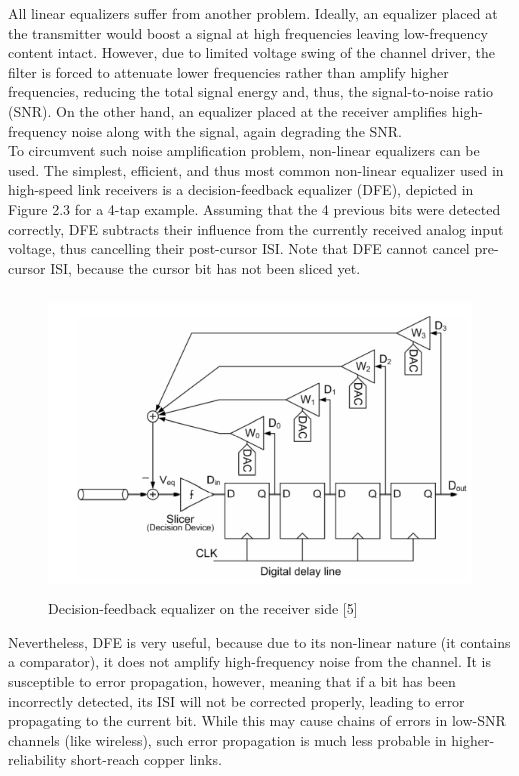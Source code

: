 All linear equalizers suffer from another problem. Ideally, an equalizer 
placed at the transmitter would boost a signal at high frequencies leaving low-frequency content intact. However, due to limited voltage swing of the channel driver, 
the filter is forced to attenuate lower frequencies rather than amplify higher 
frequencies, reducing the total signal energy and, thus, the signal-to-noise ratio (SNR). 
On the other hand, an equalizer placed at the receiver amplifies high-frequency noise 
along with the signal, again degrading the SNR.\\

To circumvent such noise amplification problem, non-linear equalizers 
can be used. The simplest, efficient, and thus most common non-linear equalizer used 
in high-speed link receivers is a decision-feedback equalizer (DFE), depicted in 
Figure 2.3 for a 4-tap example. Assuming that the 4 previous bits were detected 
correctly, DFE subtracts their influence from the currently received analog input 
voltage, thus cancelling their post-cursor ISI. Note that DFE cannot cancel pre-cursor 
ISI, because the cursor bit has not been sliced yet.

\begin{figure}[h]
	\centering
	\includegraphics[width=12cm,height=8cm]{fig2_3.png}
	\caption{Decision-feedback equalizer on the receiver side
[5]}
	\label{DFE}
\end{figure}

Nevertheless, DFE is very useful, because due to its non-linear nature 
(it contains a comparator), it does not amplify high-frequency noise from the channel. 
It is susceptible to error propagation, however, meaning that if a bit has been 
incorrectly detected, its ISI will not be corrected properly, leading to error propagating 
to the current bit. While this may cause chains of errors in low-SNR channels (like 
wireless), such error propagation is much less probable in higher-reliability short-reach copper links.



